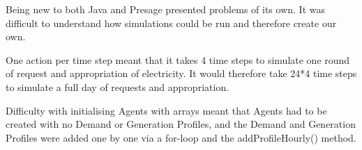 Being new to both Java and Presage presented problems of its own. It was difficult to understand how simulations could be run and therefore create our own.

One action per time step meant that it takes 4 time steps to simulate one round of request and appropriation of electricity. It would therefore take 24*4 time steps to simulate a full day of requests and appropriation.

Difficulty with initialising Agents with arrays meant that Agents had to be created with no Demand or Generation Profiles, and the Demand and Generation Profiles were added one by one via a for-loop and the addProfileHourly() method.


